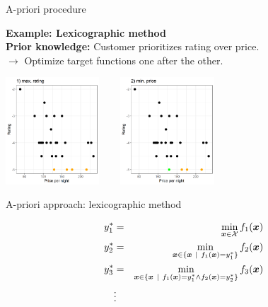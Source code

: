 \documentclass[11pt,compress,t,notes=noshow, xcolor=table]{beamer}
\begin{document}
\begin{vbframe}{A-priori procedure}
\framebreak

\textbf{Example: Lexicographic method}\\
\textbf{Prior knowledge:} Customer prioritizes rating over price. \\
$\to$ Optimize target functions one after the other.

\lz

\begin{center}
\includegraphics[height=4cm, width =0.35\linewidth]{figure_man/priori3.png} ~~~ \includegraphics[height=4cm, width =0.35\linewidth]{figure_man/priori4.png}
\end{center}

%
%

\framebreak

A-priori approach: lexicographic method

\begin{eqnarray*}
y_1^* &=& \min_{\bm{x} \in \mathcal{X}} f_1(\bm{x})\\
y_2^* &=& \min_{\bm{x} \in \{\bm{x} ~|~ f_1(\bm{x}) = y_1^*\}} f_2(\bm{x}) \\
y_3^* &=& \min_{\bm{x} \in \{\bm{x} ~|~ f_1(\bm{x}) = y_1^* \land f_2(\bm{x}) = y_2^*\}} f_3(\bm{x}) \\
&\vdots&
\end{eqnarray*}


\end{vbframe}
\end{document}
